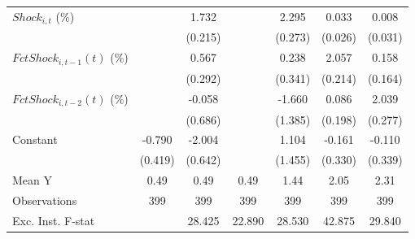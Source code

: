 {\begin{tabular}{l*{6}{c}}
\addlinespace
$ Shock_{i,t}$ (\%) &                     &       1.732\sym{***}&                     &       2.295\sym{***}&       0.033         &       0.008         \\
                    &                     &     (0.215)         &                     &     (0.273)         &     (0.026)         &     (0.031)         \\
\addlinespace
$ FctShock_{i,t-1}(t)$ (\%)&                     &       0.567\sym{*}  &                     &       0.238         &       2.057\sym{***}&       0.158         \\
                    &                     &     (0.292)         &                     &     (0.341)         &     (0.214)         &     (0.164)         \\
\addlinespace
$ FctShock_{i,t-2}(t)$ (\%)&                     &      -0.058         &                     &      -1.660         &       0.086         &       2.039\sym{***}\\
                    &                     &     (0.686)         &                     &     (1.385)         &     (0.198)         &     (0.277)         \\
\addlinespace
Constant            &      -0.790\sym{*}  &      -2.004\sym{***}&                     &       1.104         &      -0.161         &      -0.110         \\
                    &     (0.419)         &     (0.642)         &                     &     (1.455)         &     (0.330)         &     (0.339)         \\
\midrule
Mean Y              &        0.49         &        0.49         &        0.49         &        1.44         &        2.05         &        2.31         \\
Observations        &         399         &         399         &         399         &         399         &         399         &         399         \\
Exc. Inst. F-stat   &                     &      28.425         &      22.890         &      28.530         &      42.875         &      29.840         \\
\bottomrule
\end{tabular}
}
